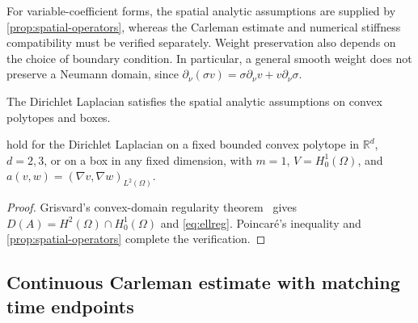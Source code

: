 \documentclass[print,wide,eng]{draft}
\begin{document}
For variable-coefficient forms, the spatial analytic assumptions are supplied by \cref{prop:spatial-operators}, whereas the Carleman estimate and numerical stiffness compatibility must be verified separately. Weight preservation also depends on the choice of boundary condition. In particular, a general smooth weight does not preserve a Neumann domain, since $\partial_\nu(\sigma v)=\sigma\partial_\nu v+v\partial_\nu\sigma$.

The Dirichlet Laplacian satisfies the spatial analytic assumptions on convex polytopes and boxes.
%
\begin{corollary}\label{prop:analytic-realizations}
 hold for the Dirichlet Laplacian on a fixed bounded convex polytope in $\mathbb R^d$, $d=2,3$, or on a box in any fixed dimension, with $m=1$, $V=H_0^1(\Omega)$, and $a(v,w)=(\nabla v,\nabla w)_{L^2(\Omega)}$.
\end{corollary}
%
\begin{proof}
Grisvard's convex-domain regularity theorem~\cite[Theorem~3.2.1.2]{Grisvard2011} gives $D(A)=H^2(\Omega)\cap H_0^1(\Omega)$ and \cref{eq:ellreg}. Poincar\'e's inequality and \cref{prop:spatial-operators} complete the verification.
\end{proof}
%

\subsection{Continuous Carleman estimate with matching time endpoints}
\end{document}
